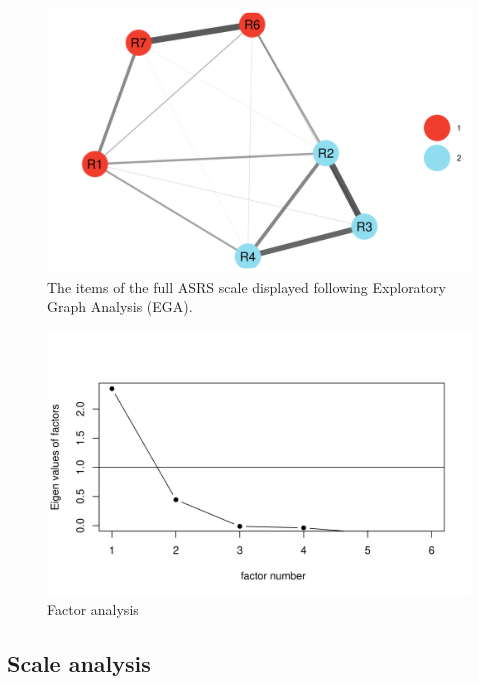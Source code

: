\documentclass[
  ,jou,floatsintext]{apa6}
\begin{document}
\begin{figure}

{\centering \includegraphics[width=1\linewidth]{plots/reason6_ega} 

}

\caption{The items of the full ASRS scale displayed following Exploratory Graph Analysis (EGA).}\label{fig:egasix}
\end{figure}

\begin{figure}

{\centering \includegraphics[width=1\linewidth]{plots/reason_scree6} 

}

\caption{Factor analysis}\label{fig:factors}
\end{figure}

\hypertarget{scale-analysis}{%
\subsection{Scale analysis}\label{scale-analysis}}
\end{document}
